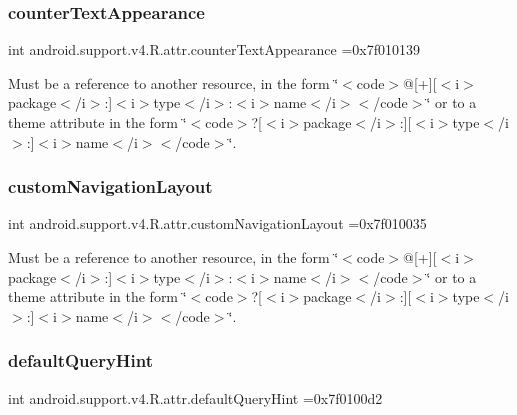 \subsubsection{\texorpdfstring{counter\+Text\+Appearance}{counterTextAppearance}}
{\footnotesize\ttfamily int android.\+support.\+v4.\+R.\+attr.\+counter\+Text\+Appearance =0x7f010139\hspace{0.3cm}{\ttfamily [static]}}

Must be a reference to another resource, in the form \char`\"{}$<$code$>$@\mbox{[}+\mbox{]}\mbox{[}$<$i$>$package$<$/i$>$\+:\mbox{]}$<$i$>$type$<$/i$>$\+:$<$i$>$name$<$/i$>$$<$/code$>$\char`\"{} or to a theme attribute in the form \char`\"{}$<$code$>$?\mbox{[}$<$i$>$package$<$/i$>$\+:\mbox{]}\mbox{[}$<$i$>$type$<$/i$>$\+:\mbox{]}$<$i$>$name$<$/i$>$$<$/code$>$\char`\"{}. \mbox{\label{classandroid_1_1support_1_1v4_1_1R_1_1attr_a79b992d45ea08400e2b705f6352e89f2}} 
\subsubsection{\texorpdfstring{custom\+Navigation\+Layout}{customNavigationLayout}}
{\footnotesize\ttfamily int android.\+support.\+v4.\+R.\+attr.\+custom\+Navigation\+Layout =0x7f010035\hspace{0.3cm}{\ttfamily [static]}}

Must be a reference to another resource, in the form \char`\"{}$<$code$>$@\mbox{[}+\mbox{]}\mbox{[}$<$i$>$package$<$/i$>$\+:\mbox{]}$<$i$>$type$<$/i$>$\+:$<$i$>$name$<$/i$>$$<$/code$>$\char`\"{} or to a theme attribute in the form \char`\"{}$<$code$>$?\mbox{[}$<$i$>$package$<$/i$>$\+:\mbox{]}\mbox{[}$<$i$>$type$<$/i$>$\+:\mbox{]}$<$i$>$name$<$/i$>$$<$/code$>$\char`\"{}. \mbox{\label{classandroid_1_1support_1_1v4_1_1R_1_1attr_a825f7cdc9650f92601bc34873e291e96}} 
\subsubsection{\texorpdfstring{default\+Query\+Hint}{defaultQueryHint}}
{\footnotesize\ttfamily int android.\+support.\+v4.\+R.\+attr.\+default\+Query\+Hint =0x7f0100d2\hspace{0.3cm}{\ttfamily [static]}}

